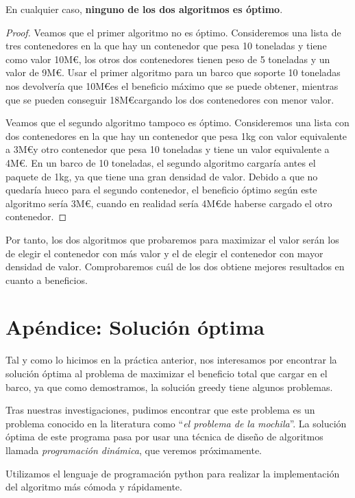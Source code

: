 \documentclass[a4paper, 11pt]{article}
\begin{document}
En cualquier caso, \textbf{ninguno de los dos algoritmos es óptimo}.

\begin{proof}
Veamos que el primer algoritmo no es óptimo. Consideremos una lista de tres contenedores en la que hay un contenedor que pesa 10 toneladas y tiene como valor 10M\euro, los otros dos contenedores tienen peso de 5 toneladas y un valor de 9M\euro. Usar el primer algoritmo para un barco que soporte 10 toneladas nos devolvería que 10M\euro es el beneficio máximo que se puede obtener, mientras que se pueden conseguir 18M\euro cargando los dos contenedores con menor valor.

Veamos que el segundo algoritmo tampoco es óptimo. Consideremos una lista con dos contenedores en la que hay un contenedor que pesa 1kg con valor equivalente a 3M\euro  y otro contenedor que pesa 10 toneladas y tiene un valor equivalente a 4M\euro. En un barco de 10 toneladas, el segundo algoritmo cargaría antes el paquete de 1kg, ya que tiene una gran densidad de valor. Debido a que no quedaría hueco para el segundo contenedor, el beneficio óptimo según este algoritmo sería 3M\euro, cuando en realidad sería 4M\euro de haberse cargado el otro contenedor.

\end{proof}

Por tanto, los dos algoritmos que probaremos para maximizar el valor serán los de elegir el contenedor con más valor y el de elegir el contenedor con mayor densidad de valor. Comprobaremos cuál de los dos obtiene mejores resultados en cuanto a beneficios.

\section{Apéndice: Solución óptima}
Tal y como lo hicimos en la práctica anterior, nos interesamos por encontrar la solución óptima al problema de maximizar el beneficio total que cargar en el barco, ya que como demostramos, la solución greedy tiene algunos problemas.

Tras nuestras investigaciones, pudimos encontrar que este problema es un problema conocido en la literatura como ``\textit{el problema de la mochila}''. La solución óptima de este programa pasa por usar una técnica de diseño de algoritmos llamada \textit{programación dinámica}, que veremos próximamente.

Utilizamos el lenguaje de programación python para realizar la implementación del algoritmo más cómoda y rápidamente.	
\end{document}
